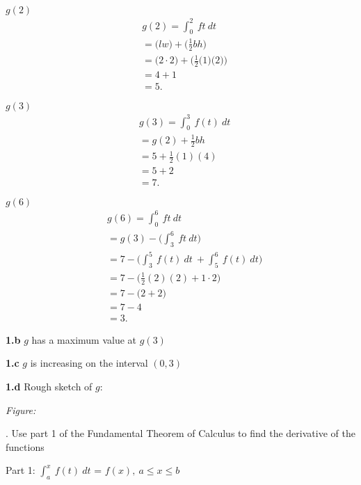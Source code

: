 \documentclass{report}
\begin{document}
   $g(2) $
   \begin{align*}
       &g(2) = \int_{0}^{2}\ ft\ dt \\
       &= \bigg(lw\bigg)+\bigg(\frac{1}{2}bh\bigg) \\
       &=\bigg(2\cdot 2\bigg) + \bigg(\frac{1}{2}\bigg(1\bigg)\bigg(2\bigg)\bigg) \\
       &=4+1 \\
       &=5
   .\end{align*}
   \bigbreak \noindent 

   $g(3)$
   \begin{align*}
       &g(3) = \int_{0}^{3}\ f(t)\ dt \\
       &= g(2) + \frac{1}{2}bh \\
       &=5 + \frac{1}{2}(1)(4) \\
       &=5+2 \\
       &=7
   .\end{align*}
   \bigbreak \noindent 

   $g(6)$
   \begin{align*}
       &g(6) = \int_{0}^{6}\ ft\ dt \\
       &= g(3) - \bigg(\int_{3}^{6}\ ft\ dt\bigg) \\
       &= 7 - \bigg(\int_{3}^{5}\ f(t)\ dt\ + \int_{5}^{6}\ f(t)\ dt\bigg) \\
       &= 7 - \bigg(\frac{1}{2}(2)(2) + 1\cdot 2\bigg) \\
        &= 7- \bigg(2 + 2\bigg) \\
        &= 7- 4 \\
        &= 3
   .\end{align*}

   \pagebreak \bigbreak \noindent 
   \textbf{1.b} $g$ has a maximum value at $g(3)$

   \bigbreak \noindent 
   \textbf{1.c} $g$ is increasing on the interval $(0,3) $

   \bigbreak \noindent 
   \textbf{1.d} Rough sketch of $g$:
   \bigbreak \noindent 

   \textit{Figure:}
    \begin{figure}[ht]
        \centering
        \label{fig:roughsketch}
    \end{figure}
    \bigbreak {}. Use part 1 of the Fundamental Theorem of Calculus to find the derivative of the functions
    \bigbreak \noindent 
        \begin{remark}
       Part 1: $\int_{a}^{x}\ f(t)\ dt $ = $f(x),\ a \leq x \leq b $ 
    \end{remark}
\end{document}
